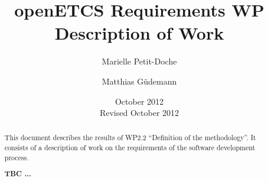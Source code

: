 \documentclass{template/openetcs_article}
\begin{document}
\frontmatter
{}




\title{openETCS Requirements WP Description of Work}


\date{October 2012\\Revised October 2012}


\author{Marielle Petit-Doche}

\author{Matthias Güdemann}






\begin{abstract}

  This document describes the results of WP2.2 ``Definition of the
  methodology''. It consists of a description of work on the requirements of the
  software development process.

  {\bf TBC ...}
\end{abstract}

\maketitle
\tableofcontents
\listoffiguresandtables
\newpage



\end{document}
